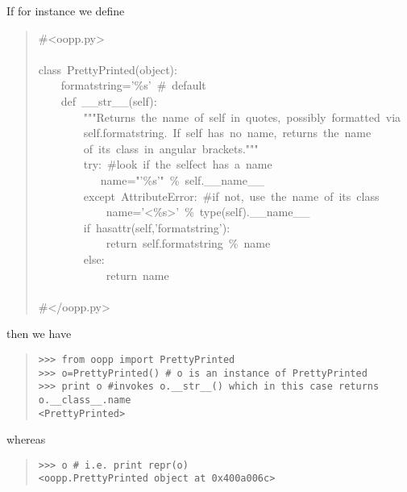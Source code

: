 \documentclass[10pt,english]{article}
\begin{document}
If for instance we define
\begin{quote}
\begin{ttfamily}\begin{flushleft}
\mbox{{\#}<oopp.py>}\\
\mbox{}\\
\mbox{class~PrettyPrinted(object):}\\
\mbox{~~~~formatstring='{\%}s'~{\#}~default}\\
\mbox{~~~~def~{\_}{\_}str{\_}{\_}(self):}\\
\mbox{~~~~~~~~"""Returns~the~name~of~self~in~quotes,~possibly~formatted~via~}\\
\mbox{~~~~~~~~self.formatstring.~If~self~has~no~name,~returns~the~name~}\\
\mbox{~~~~~~~~of~its~class~in~angular~brackets."""~}\\
\mbox{~~~~~~~~try:~{\#}look~if~the~selfect~has~a~name~}\\
\mbox{~~~~~~~~~~~name="'{\%}s'"~{\%}~self.{\_}{\_}name{\_}{\_}~}\\
\mbox{~~~~~~~~except~AttributeError:~{\#}if~not,~use~the~name~of~its~class}\\
\mbox{~~~~~~~~~~~~name='<{\%}s>'~{\%}~type(self).{\_}{\_}name{\_}{\_}}\\
\mbox{~~~~~~~~if~hasattr(self,'formatstring'):}\\
\mbox{~~~~~~~~~~~~return~self.formatstring~{\%}~name}\\
\mbox{~~~~~~~~else:~}\\
\mbox{~~~~~~~~~~~~return~name}\\
\mbox{}\\
\mbox{{\#}</oopp.py>}
\end{flushleft}\end{ttfamily}
\end{quote}

then we have
\begin{quote}
\begin{verbatim}>>> from oopp import PrettyPrinted
>>> o=PrettyPrinted() # o is an instance of PrettyPrinted
>>> print o #invokes o.__str__() which in this case returns o.__class__.name
<PrettyPrinted>\end{verbatim}
\end{quote}

whereas
\begin{quote}
\begin{verbatim}>>> o # i.e. print repr(o)
<oopp.PrettyPrinted object at 0x400a006c>\end{verbatim}
\end{quote}
\end{document}
